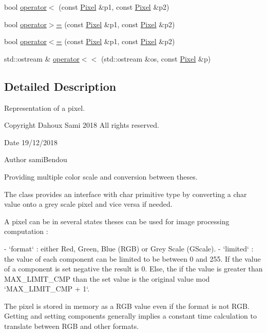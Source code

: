 \begin{DoxyCompactItemize}
\item 
bool \mbox{\hyperlink{class_pixel_a6cc03ea69b84151454e6cb42b066f3c6}{operator$<$}} (const \mbox{\hyperlink{class_pixel}{Pixel}} \&p1, const \mbox{\hyperlink{class_pixel}{Pixel}} \&p2)
\item 
bool \mbox{\hyperlink{class_pixel_a9564c5098775053d65c9f052b9281388}{operator$>$=}} (const \mbox{\hyperlink{class_pixel}{Pixel}} \&p1, const \mbox{\hyperlink{class_pixel}{Pixel}} \&p2)
\item 
bool \mbox{\hyperlink{class_pixel_a8e1356c4b2066282783d0c03526bd34f}{operator$<$=}} (const \mbox{\hyperlink{class_pixel}{Pixel}} \&p1, const \mbox{\hyperlink{class_pixel}{Pixel}} \&p2)
\item 
std\+::ostream \& \mbox{\hyperlink{class_pixel_af9850b2e5c78fc7f7e841c490713168e}{operator$<$$<$}} (std\+::ostream \&os, const \mbox{\hyperlink{class_pixel}{Pixel}} \&p)
\end{DoxyCompactItemize}


\subsection{Detailed Description}
Representation of a pixel. 

\begin{DoxyCopyright}{Copyright}
Dahoux Sami 2018 All rights reserved. 
\end{DoxyCopyright}
\begin{DoxyDate}{Date}
19/12/2018 
\end{DoxyDate}
\begin{DoxyAuthor}{Author}
sami\+Bendou
\end{DoxyAuthor}
Providing multiple color scale and conversion between theses. \begin{DoxyVerb}     The class provides an interface with char primitive
     type by converting a char value onto a grey scale pixel and vice versa if needed.

     A pixel can be in several states theses can be used for image processing computation :

        - `format`    : either Red, Green, Blue (RGB) or Grey Scale (GScale).
        - `limited`   : the value of each component can be limited to be between 0 and 255.
                        If the value of a component is set negative the result is 0. Else,
                        the if the value is greater than MAX_LIMIT_CMP than the set value
                        is the original value mod `MAX_LIMIT_CMP + 1`.

     The pixel is stored in memory as a RGB value even if the format is not RGB. Getting and
     setting components generally implies a constant time calculation to translate between RGB
     and other formats.
\end{DoxyVerb}
 

